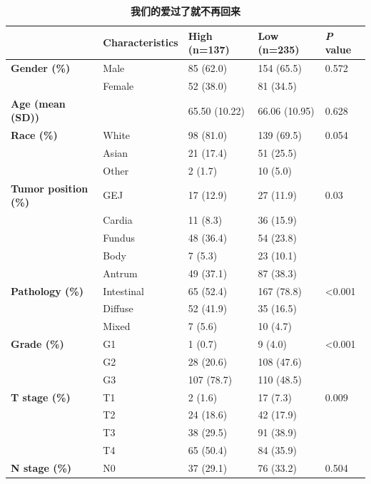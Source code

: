 \begin{table}[htbp]
    \centering
    \fontsize{12}{13}\selectfont
    \caption{\textbf{我们的爱过了就不再回来}}
    \begin{tabular}{lllll}
    \toprule
            & \textbf{Characteristics} & \textbf{High (n=137)} & \textbf{Low (n=235)} & \textbf{\textit{P} value} \\
    \toprule
    \textbf{Gender (\%)} & Male  & 85 (62.0) & 154 (65.5) & 0.572 \\
            & Female & 52 (38.0) & 81 (34.5) &  \\
    \textbf{Age (mean (SD))} &       & 65.50 (10.22) & 66.06 (10.95) & 0.628 \\
    \textbf{Race (\%)} & White & 98 (81.0) & 139 (69.5) & 0.054 \\
            & Asian & 21 (17.4) & 51 (25.5) &  \\
            & Other & 2 (1.7) & 10 (5.0) &  \\
    \textbf{Tumor position (\%)} & GEJ   & 17 (12.9) & 27 (11.9) & 0.03 \\
            & Cardia & 11 (8.3) & 36 (15.9) &  \\
            & Fundus & 48 (36.4) & 54 (23.8) &  \\
            & Body  & 7 (5.3) & 23 (10.1) &  \\
            & Antrum & 49 (37.1) & 87 (38.3) &  \\
    \textbf{Pathology (\%)} & Intestinal & 65 (52.4) & 167 (78.8) & <0.001 \\
            & Diffuse & 52 (41.9) & 35 (16.5) &  \\
            & Mixed & 7 (5.6) & 10 (4.7) &  \\
    \textbf{Grade (\%)} & G1    & 1 (0.7) & 9 (4.0) & <0.001 \\
            & G2    & 28 (20.6) & 108 (47.6) &  \\
            & G3    & 107 (78.7) & 110 (48.5) &  \\
    \textbf{T stage (\%)} & T1    & 2 (1.6) & 17 (7.3) & 0.009 \\
            & T2    & 24 (18.6) & 42 (17.9) &  \\
            & T3    & 38 (29.5) & 91 (38.9) &  \\
            & T4    & 65 (50.4) & 84 (35.9) &  \\
    \textbf{N stage (\%)} & N0    & 37 (29.1) & 76 (33.2) & 0.504 \\

\end{tabular}
\end{table}
